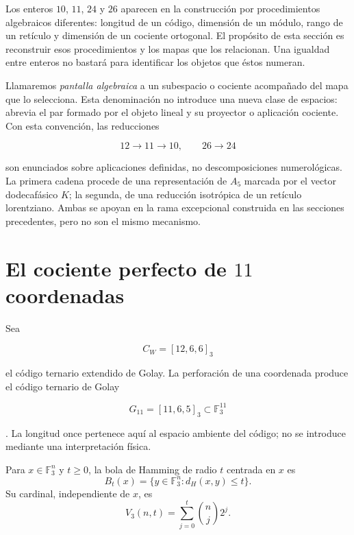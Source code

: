 \label{chap:pantallas-dualidad}

Los enteros \(10\), \(11\), \(24\) y \(26\) aparecen en la construcción por
procedimientos algebraicos diferentes: longitud de un código, dimensión de un
módulo, rango de un retículo y dimensión de un cociente ortogonal. El
propósito de esta sección es reconstruir esos procedimientos y los mapas que
los relacionan. Una igualdad entre enteros no bastará para identificar los
objetos que éstos numeran.

Llamaremos \emph{pantalla algebraica} a un subespacio o cociente acompañado
del mapa que lo selecciona. Esta denominación no introduce una nueva clase de
espacios: abrevia el par formado por el objeto lineal y su proyector o
aplicación cociente. Con esta convención, las reducciones

\[
12\longrightarrow11\longrightarrow10,
\qquad
26\longrightarrow24
\]

son enunciados sobre aplicaciones definidas, no descomposiciones numerológicas.
La primera cadena procede de una representación de \(A_5\) marcada por el
vector dodecafásico \(K\); la segunda, de una reducción isotrópica de un
retículo lorentziano. Ambas se apoyan en la rama excepcional construida en
las secciones precedentes, pero no son el mismo mecanismo.

\section{El cociente perfecto de \(11\) coordenadas}
\label{sec:golay-once}

Sea

\[
C_W=[12,6,6]_3
\]

el código ternario extendido de Golay. La perforación de una coordenada
produce el código ternario de Golay

\[
G_{11}=[11,6,5]_3\subset\mathbb F_3^{11}
\]

\cite{MacWilliamsSloane1977}. La longitud once pertenece aquí al espacio
ambiente del código; no se introduce mediante una interpretación física.

\begin{definition}
Para \(x\in\mathbb F_3^n\) y \(t\geq0\), la bola de Hamming de radio \(t\)
centrada en \(x\) es
\[
B_t(x)=\{y\in\mathbb F_3^n:d_H(x,y)\leq t\}.
\]
Su cardinal, independiente de \(x\), es
\[
V_3(n,t)=\sum_{j=0}^{t}\binom nj2^j.
\]
\end{definition}

